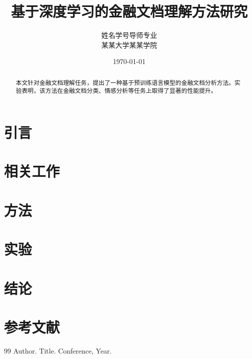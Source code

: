 \documentclass[UTF8, a4paper, 12pt]{ctexart}
\begin{document}
\title{基于深度学习的金融文档理解方法研究}
\author{
    姓名\qquad 学号\qquad 导师\qquad 专业\\
    某某大学\quad 某某学院
}

\date{\today}

\maketitle

\begin{abstract}
本文针对金融文档理解任务，提出了一种基于预训练语言模型的金融文档分析方法。实验表明，该方法在金融文档分类、情感分析等任务上取得了显著的性能提升。
\end{abstract}


\section{引言}

\section{相关工作}

\section{方法}

\section{实验}

\section{结论}

\section*{参考文献}

\begin{thebibliography}{99}
     Author. Title. Conference, Year.
\end{thebibliography}
\end{document}
